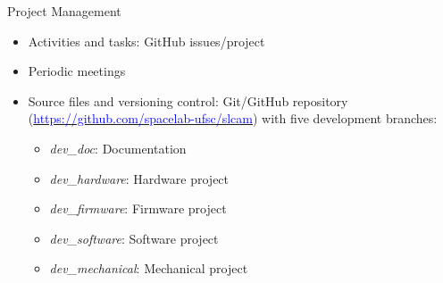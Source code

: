 %
%
%
%
%

%
%
%
%
%


\begin{frame}{Project Management}

    \begin{itemize}
        \item Activities and tasks: GitHub issues/project
        \vspace{0.25cm}
        \item Periodic meetings
        \vspace{0.25cm}
        \item Source files and versioning control: Git/GitHub repository (\href{https://github.com/spacelab-ufsc/camera}{\textcolor{blue}{https://github.com/spacelab-ufsc/slcam}}) with five development branches:
            \begin{itemize}
                \item \textit{dev\_doc}: Documentation
                \item \textit{dev\_hardware}: Hardware project
                \item \textit{dev\_firmware}: Firmware project
                \item \textit{dev\_software}: Software project
                \item \textit{dev\_mechanical}: Mechanical project
            \end{itemize}
    \end{itemize}

\end{frame}


